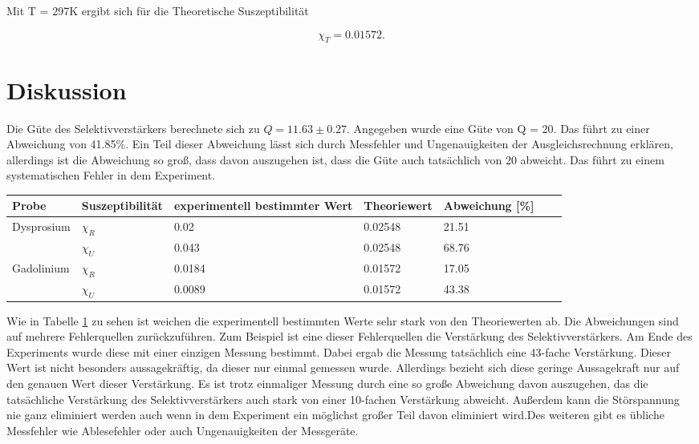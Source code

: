 Mit T = 297K ergibt sich für die Theoretische Suszeptibilität

\begin{equation*}
    \chi_T = 0.01572.
\end{equation*}

\section{Diskussion}

Die Güte des Selektivverstärkers berechnete sich zu $Q = 11.63\pm 0.27$. Angegeben wurde eine Güte von Q = 20. Das führt zu einer Abweichung von 41.85\%. Ein Teil dieser Abweichung lässt sich durch Messfehler und Ungenauigkeiten der Ausgleichsrechnung erklären, allerdings ist die Abweichung so groß, dass davon auszugehen ist, dass die Güte auch tatsächlich von 20 abweicht. Das führt zu einem systematischen Fehler in dem Experiment.

\begin{minipage}{\linewidth}
    \begin{table}[H]
        \centering
    \begin{tabular}{lllllll}
        \toprule
        Probe & Suszeptibilität & experimentell bestimmter Wert & Theoriewert & Abweichung [\%] \\
        \midrule
        Dysprosium  & $\chi_R$ & 0.02   & 0.02548 & 21.51 \\
                    & $\chi_U$ & 0.043  & 0.02548 & 68.76 \\
        Gadolinium  & $\chi_R$ & 0.0184 & 0.01572 & 17.05 \\
                    & $\chi_U$ & 0.0089 & 0.01572 & 43.38 \\
        \bottomrule   
    \end{tabular}
    
    \label{tab:disk}
\end{table}
\end{minipage}

\noindent Wie in Tabelle \ref{tab:disk} zu sehen ist weichen die experimentell bestimmten Werte sehr stark von den Theoriewerten ab. Die Abweichungen sind auf mehrere Fehlerquellen zurückzuführen. Zum Beispiel ist eine dieser Fehlerquellen die Verstärkung des Selektivverstärkers. Am Ende des Experiments wurde diese mit einer einzigen Messung bestimmt. Dabei ergab die Messung  tatsächlich eine 43-fache Verstärkung. Dieser Wert ist nicht besonders aussagekräftig, da dieser nur einmal gemessen wurde. Allerdings bezieht sich diese geringe Aussagekraft nur auf den genauen Wert dieser Verstärkung. Es ist trotz einmaliger Messung durch eine so große Abweichung davon auszugehen, das die tatsächliche Verstärkung des Selektivverstärkers auch stark von einer 10-fachen Verstärkung abweicht. Außerdem kann die Störspannung nie ganz eliminiert werden auch wenn in dem Experiment ein möglichst großer Teil davon eliminiert wird.Des weiteren gibt es übliche Messfehler wie Ablesefehler oder auch Ungenauigkeiten der Messgeräte. 

